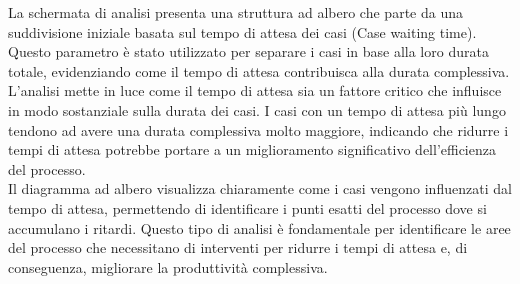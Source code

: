 \documentclass{article}
\begin{document}
La schermata di analisi presenta una struttura ad albero che parte da una suddivisione iniziale basata sul tempo di attesa dei casi (Case waiting time). Questo parametro è stato utilizzato per separare i casi in base alla loro durata totale, evidenziando come il tempo di attesa contribuisca alla durata complessiva.\\
L'analisi mette in luce come il tempo di attesa sia un fattore critico che influisce in modo sostanziale sulla durata dei casi. I casi con un tempo di attesa più lungo tendono ad avere una durata complessiva molto maggiore, indicando che ridurre i tempi di attesa potrebbe portare a un miglioramento significativo dell'efficienza del processo.\\
Il diagramma ad albero visualizza chiaramente come i casi vengono influenzati dal tempo di attesa, permettendo di identificare i punti esatti del processo dove si accumulano i ritardi. Questo tipo di analisi è fondamentale per identificare le aree del processo che necessitano di interventi per ridurre i tempi di attesa e, di conseguenza, migliorare la produttività complessiva.\\
\end{document}
